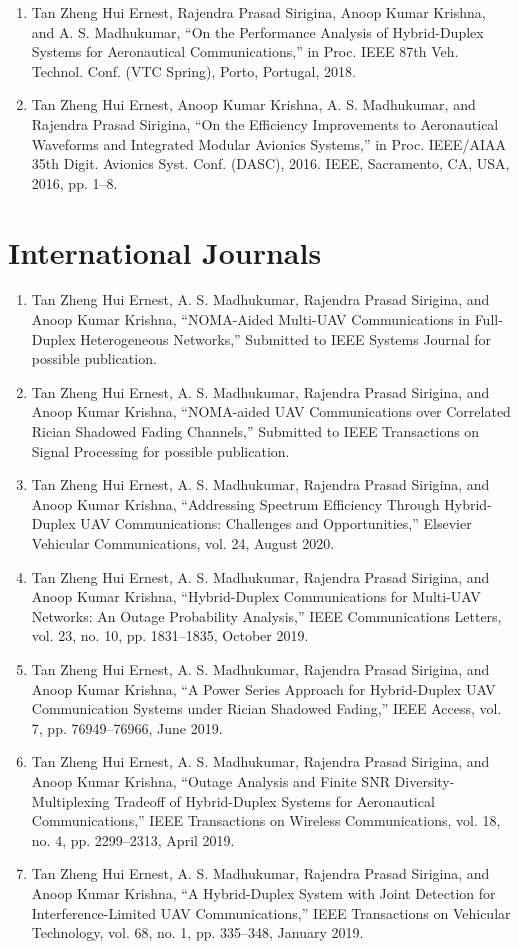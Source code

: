 \begin{enumerate}
		\item	Tan Zheng Hui Ernest, Rajendra Prasad Sirigina, Anoop Kumar Krishna, and A. S. Madhukumar, “On the Performance Analysis of Hybrid-Duplex Systems for Aeronautical Communications,” in Proc. IEEE 87th Veh. Technol. Conf. (VTC Spring), Porto, Portugal, 2018.
		\item Tan Zheng Hui Ernest, Anoop Kumar Krishna, A. S. Madhukumar, and Rajendra Prasad Sirigina, “On the Efficiency Improvements to Aeronautical Waveforms and Integrated Modular Avionics Systems,” in Proc. IEEE/AIAA 35th Digit. Avionics Syst. Conf. (DASC), 2016. IEEE, Sacramento, CA, USA, 2016, pp. 1–8.
\end{enumerate}

\section* {International Journals}
\begin{enumerate}
		\item	Tan Zheng Hui Ernest, A. S. Madhukumar, Rajendra Prasad Sirigina, and Anoop Kumar Krishna, “NOMA-Aided Multi-UAV Communications in Full-Duplex Heterogeneous Networks,” Submitted to IEEE Systems Journal for possible publication.
		\item Tan Zheng Hui Ernest, A. S. Madhukumar, Rajendra Prasad Sirigina, and Anoop Kumar Krishna, “NOMA-aided UAV Communications over Correlated Rician Shadowed Fading Channels,” Submitted to IEEE Transactions on Signal Processing for possible publication.
		\item	Tan Zheng Hui Ernest, A. S. Madhukumar, Rajendra Prasad Sirigina, and Anoop Kumar Krishna, “Addressing Spectrum Efficiency Through Hybrid-Duplex UAV Communications: Challenges and Opportunities,” Elsevier Vehicular Communications, vol. 24, August 2020.
		\item Tan Zheng Hui Ernest, A. S. Madhukumar, Rajendra Prasad Sirigina, and Anoop Kumar Krishna, “Hybrid-Duplex Communications for Multi-UAV Networks: An Outage Probability Analysis,” IEEE Communications Letters, vol. 23, no. 10, pp. 1831–1835, October 2019.
		\item Tan Zheng Hui Ernest, A. S. Madhukumar, Rajendra Prasad Sirigina, and Anoop Kumar Krishna, “A Power Series Approach for Hybrid-Duplex UAV Communication Systems under Rician Shadowed Fading,” IEEE Access, vol. 7, pp. 76949–76966, June 2019.
		\item Tan Zheng Hui Ernest, A. S. Madhukumar, Rajendra Prasad Sirigina, and Anoop Kumar Krishna, “Outage Analysis and Finite SNR Diversity-Multiplexing Tradeoff of Hybrid-Duplex Systems for Aeronautical Communications,” IEEE Transactions on Wireless Communications, vol. 18, no. 4, pp. 2299–2313, April 2019.
		\item	Tan Zheng Hui Ernest, A. S. Madhukumar, Rajendra Prasad Sirigina, and Anoop Kumar Krishna, “A Hybrid-Duplex System with Joint Detection for Interference-Limited UAV Communications,” IEEE Transactions on Vehicular Technology, vol. 68, no. 1, pp. 335–348, January 2019.
\end{enumerate}
